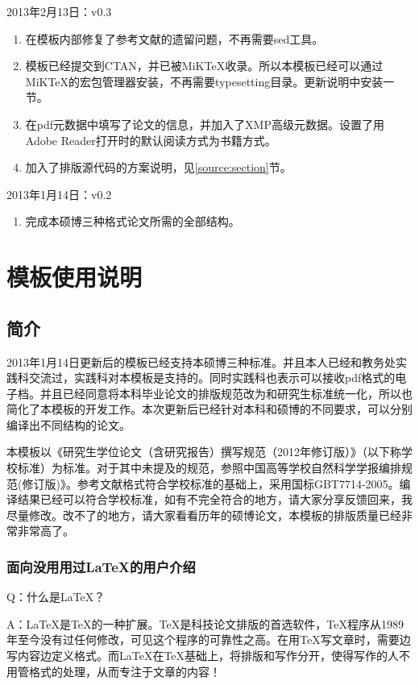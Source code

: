 \noindent
2013年2月13日：v0.3
\begin{enumerate}
\item 在模板内部修复了参考文献的遗留问题，不再需要sed工具。
\item 模板已经提交到CTAN，并已被MiKTeX收录。所以本模板已经可以通过MiKTeX的宏包管理器安装，不再需要typesetting目录。更新说明中安装一节。
\item 在pdf元数据中填写了论文的信息，并加入了XMP高级元数据。设置了用Adobe Reader打开时的默认阅读方式为书籍方式。
\item 加入了排版源代码的方案说明，见\ref{source:section}节。
\end{enumerate}

\noindent
2013年1月14日：v0.2
\begin{enumerate}
\item 完成本硕博三种格式论文所需的全部结构。
\end{enumerate}

\chapter{模板使用说明}
\section{简介}
2013年1月14日更新后的模板已经支持本硕博三种标准。并且本人已经和教务处实践科交流过，实践科对本模板是支持的。同时实践科也表示可以接收pdf格式的电子档。并且已经同意将本科毕业论文的排版规范改为和研究生标准统一化，所以也简化了本模板的开发工作。本次更新后已经针对本科和硕博的不同要求，可以分别编译出不同结构的论文。

本模板以《研究生学位论文（含研究报告）撰写规范（2012年修订版）》（以下称学校标准）为标准。对于其中未提及的规范，参照中国高等学校自然科学学报编排规范(修订版)》。参考文献格式符合学校标准的基础上，采用国标GBT7714-2005。编译结果已经可以符合学校标准，如有不完全符合的地方，请大家分享反馈回来，我尽量修改。改不了的地方，请大家看看历年的硕博论文，本模板的排版质量已经非常非常高了。
\subsection{面向没用用过\LaTeX{}的用户介绍}
    Q：什么是\LaTeX{}？

A：\LaTeX{}是\TeX{}的一种扩展。\TeX{}是科技论文排版的首选软件，\TeX{}程序从1989年至今没有过任何修改，可见这个程序的可靠性之高。在用\TeX{}写文章时，需要边写内容边定义格式。而\LaTeX{}在\TeX{}基础上，将排版和写作分开，使得写作的人不用管格式的处理，从而专注于文章的内容！

